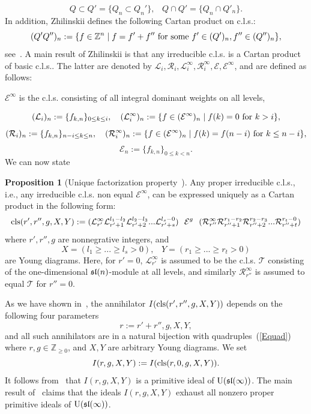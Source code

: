 \documentclass[10pt]{amsart}\oddsidemargin -1mm \evensidemargin -1mm \topmargin -15mm\headheight5mm \headsep 3.5mm \textheight 245mm\textwidth 170mm
\theoremstyle{definition}\newtheorem{theorem}{Theorem}[section]\newtheorem{lemma}[theorem]{Lemma}\newtheorem{remark}[theorem]{Remark}\newtheorem{proposition}[theorem]{Proposition}\newtheorem{corollary}[theorem]{Corollary}\newtheorem{definition}[theorem]{Definition}\newtheorem{Ex}[theorem]{Example}\newtheorem{obs}[theorem]{Observation}\newtheorem{nota}[theorem]{Notation}
\begin{document}
$$Q\subset Q'=\{Q_n\subset Q_n'\},\hspace{10pt}Q\cap Q'=\{Q_n\cap Q'_n\}.$$
In addition, Zhilinskii defines the following Cartan product on c.l.s.:
$$(Q'Q'')_n:=\{f\in\mathbb Z^{n}\mid f=f'+f''{\rm~for~some~}f'\in (Q')_n, f''\in(Q'')_n\},$$ 
see~\cite[Subsection~2.1]{Zh1}. 
A main result of Zhilinskii is that any irreducible c.l.s. is a Cartan product of basic c.l.s.. 
The latter are denoted by $\mathcal L_i, \mathcal R_i, \mathcal L_i^\infty, \mathcal R_i^\infty, \mathcal E, \mathcal E^\infty$, and are defined as follows:
\begin{center}$\mathcal E^\infty$ is the c.l.s. consisting of all integral dominant weights on all levels,\end{center}
$$(\mathcal L_i)_n:=\{f_{k, n}\}_{0\le k\le i},\hspace{10pt}(\mathcal L_i^{\infty})_n:=\{f\in(\mathcal E^\infty)_n\mid f(k)=0{\rm~for~}k> i\},$$
$$(\mathcal R_i)_n:=\{f_{k, n}\}_{n-i\le k\le n},\hspace{10pt}(\mathcal R _i^{\infty})_n:=\{f\in(\mathcal E^\infty)_n\mid f(k)=f(n-i){\rm~for~}k\le n-i\},$$
$$\mathcal E_n:=\{f_{k, n}\}_{0\le k< n}.$$
We can now state 
\begin{proposition} [{Unique factorization property~\cite[Theorem~2.3.1]{Zh1}}] Any proper irreducible c.l.s., i.e., any irreducible c.l.s. non equal $\mathcal E^\infty$, can be expressed uniquely as a Cartan product in the following form:
\begin{equation}{\rm cls}(r', r'', g, {X}, {Y}):=(\mathcal L_{r'}^\infty\mathcal
L_{r'+1}^{l_1-l_2}\mathcal L_{r'+2}^{l_2-l_3}...\mathcal
L_{r'+s}^{l_s-0})~~\mathcal E^g~~(\mathcal R_{r''}^\infty\mathcal
R_{r''+1}^{r_1-r_2}\mathcal R_{r''+2}^{r_2-r_3}...\mathcal R_{r''+t}^{r_t-0})\label{Eclsm}\end{equation}
where $r', r'', g$ are nonnegrative integers, and $${X}=(l_1\ge...\ge l_s>0),\hspace{10pt}{Y}=(r_1\ge...\ge r_t>0)$$ are Young diagrams.
Here, for $r'=0$, $\mathcal L_{r'}^\infty$ is assumed to be the  c.l.s. $\mathcal T$ consisting of the one-dimensional $\frak{sl}(n)$-module at all levels, and similarly $\mathcal R_{r''}^\infty$ is assumed to equal $\mathcal T$ for $r''=0$.
\end{proposition}
As we have shown in~\cite{PP1}, the annihilator $I({\rm cls}(r', r'', g, X, Y))$ depends on the following four parameters
\begin{equation}r:=r'+r'', g, X, Y,\label{Equad}\end{equation}
and all such annihilators are in a natural bijection with quadruples~(\ref{Equad}) where $r, g\in\mathbb Z_{\ge0}$, and $X, Y$ are arbitrary Young diagrams. 
We set $$I(r, g, X, Y):=I({\rm cls}(r, 0, g, X, Y)).$$
It follows from~\cite{Zh1} that $I(r, g, X, Y)$ is a primitive ideal of ${\rm U}(\frak{sl}(\infty))$. 
The main result of~\cite{PP5} claims that the ideals $I(r, g, X, Y)$ exhaust all nonzero proper primitive ideals of ${\rm U}(\frak{sl}(\infty))$. 
\end{document}
